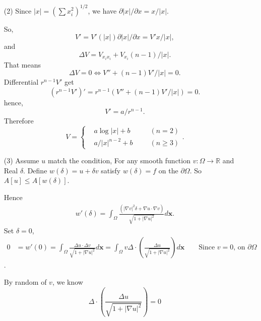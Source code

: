 \begin{solution}
    \begin{itemize}
        \item [(2)] Since $| x| = (\sum x_i^2)^{1/2}$,
        we have $\partial |x| / \partial x = x / |x|$.

        So, \[V' = V'(|x|) \partial |x| / \partial x
        = V'x / |x|,\]
        and \[\Delta V = V_{x_i x_i} + V_{x_i} (n - 1) / |x|.\]
        That means 
         \[\Delta V = 0 \Longleftrightarrow V'' + (n - 1)V'/ |x| = 0. \]
         Differential $r^{n-1} V'$ get
         \[(r^{n - 1} V')' = r^{n - 1}\left( V'' + (n - 1)V' / |x|\right) = 0.\]
         hence,
            \[V' = a / r^{n - 1}. \]
            Therefore 
            \[ V = \left\{ 
                \begin{aligned}
                &a \log |x| + b  \qquad & (n = 2) \\
                &a / |x|^{n - 2} + b &(n \geq 3)
            \end{aligned} \right. .\]

            \item[(3)] Assume $u$ match the condition, For any smooth
            function $v : \Omega \rightarrow \mathbb{R}$ and Real $\delta$.
            Define $w(\delta) = u + \delta v$ satisfy $w(\delta) = f$ on the $\partial\Omega$.
            So $A[u] \leq A[w(\delta)]$.

            Hence 
            \begin{align*}
                w'(\delta) = \int_{\Omega} \frac{ (| \nabla v |^2 \delta + \nabla u \cdot \nabla v)}
                {\sqrt{1 + | \nabla u|^2 }} d\mathbf{x}.
            \end{align*}
            Set $\delta = 0$,
            \begin{align*}
                0 &= w'(0) = \int_{\Omega} \frac{\Delta u \cdot \Delta v}{\sqrt{1 + | \nabla u|^2 }} d\mathbf{x} = \int_{\Omega} v \Delta \cdot \left( \frac{\Delta u}{\sqrt{1 + | \nabla u|^2 }}\right) d\mathbf{x} \qquad \text{Since $v = 0$, on } \partial \Omega
            \end{align*}.

            By random of $v$, we know
            \[\Delta \cdot \left( \frac{\Delta u}{\sqrt{1 + | \nabla u|^2 }} \right) = 0 \]
    \end{itemize}
\end{solution}
